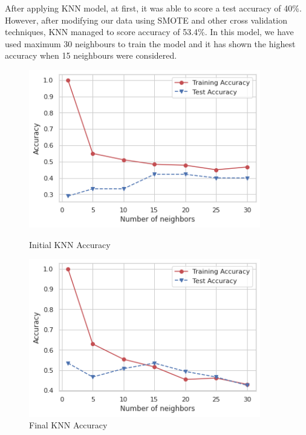 \documentclass[12pt, english]{article}
\begin{document}
After applying KNN model, at first, it was able to score a test accuracy of 40\%. However, after modifying our data using SMOTE and other cross validation techniques, KNN managed to score accuracy of 53.4\%. In this model, we have used maximum 30 neighbours to train the model and it has shown the highest accuracy when 15 neighbours were considered. 

\begin{figure}[H]
    \centering
    \begin{minipage}{0.45\textwidth}
        \centering
        \includegraphics[width=0.9\textwidth]{images/knn_first.png} %
        \caption{Initial KNN Accuracy}
    \end{minipage}\hfill
    \begin{minipage}{0.45\textwidth}
        \centering
        \includegraphics[width=0.9\textwidth]{images/knn_final.png} %
        \caption{Final KNN Accuracy}
    \end{minipage}
\end{figure}
\end{document}
